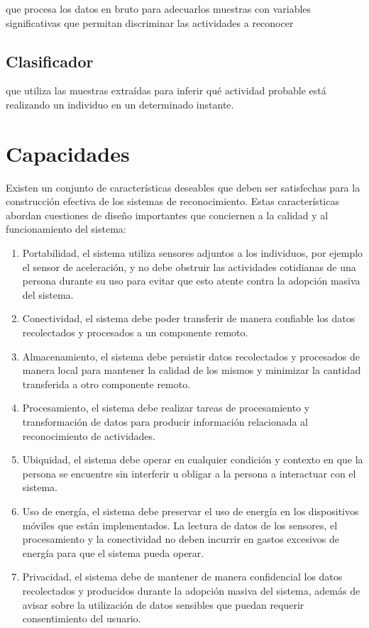 que procesa los datos en bruto para adecuarlos muestras con variables
significativas que permitan discriminar las actividades a reconocer

\subsection{Clasificador}

que utiliza las muestras extraídas para inferir qué actividad probable
está realizando un individuo en un determinado instante.

\section{Capacidades}

Existen un conjunto de características deseables que deben ser satisfechas
para la construcción efectiva de los sistemas de reconocimiento. Estas
características abordan cuestiones de diseño importantes que conciernen
a la calidad y al funcionamiento del sistema:
\begin{enumerate}
\item Portabilidad, el sistema utiliza sensores adjuntos a los individuos,
por ejemplo el sensor de aceleración, y no debe obstruir las actividades
cotidianas de una persona durante su uso para evitar que esto atente
contra la adopción masiva del sistema. 
\item Conectividad, el sistema debe poder transferir de manera confiable
los datos recolectados y procesados a un componente remoto. 
\item Almacenamiento, el sistema debe persistir datos recolectados y procesados
de manera local para mantener la calidad de los mismos y minimizar
la cantidad transferida a otro componente remoto.
\item Procesamiento, el sistema debe realizar tareas de procesamiento y
transformación de datos para producir información relacionada al reconocimiento
de actividades.
\item Ubiquidad, el sistema debe operar en cualquier condición y contexto
en que la persona se encuentre sin interferir u obligar a la persona
a interactuar con el sistema.
\item Uso de energía, el sistema debe preservar el uso de energía en los
dispositivos móviles que están implementados. La lectura de datos
de los sensores, el procesamiento y la conectividad no deben incurrir
en gastos excesivos de energía para que el sistema pueda operar.
\item Privacidad, el sistema debe de mantener de manera confidencial los
datos recolectados y producidos durante la adopción masiva del sistema,
además de avisar sobre la utilización de datos sensibles que puedan
requerir consentimiento del usuario.
\end{enumerate}

